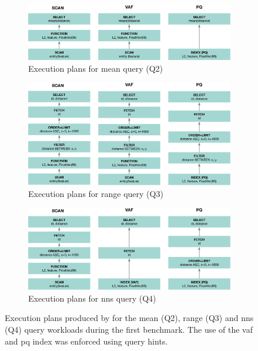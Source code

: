 \begin{figure}[p]
    \centering
    \begin{subfigure}[b]{\textwidth}
        \centering
        \includegraphics[width=\textwidth]{figures/analytics/query-plan-mean}
        \caption{Execution plans for mean query (Q2)}
        \label{figure:cottontail_analytics_mean}
    \end{subfigure}
    \hfill
    \centering
    \begin{subfigure}[b]{\textwidth}
        \centering
        \includegraphics[width=\textwidth]{figures/analytics/query-plan-range}
        \caption{Execution plans for range query (Q3)}
        \label{figure:cottontail_analytics_range}
    \end{subfigure}
    \hfill
    \centering
    \begin{subfigure}[b]{\textwidth}
        \centering
        \includegraphics[width=\textwidth]{figures/analytics/query-plan-nns}
        \caption{Execution plans for \acrshort{nns} query (Q4)}
        \label{figure:cottontail_analytics_nns}
    \end{subfigure}
    \caption{Execution plans produced by \cottontail{} for the mean (Q2), range (Q3) and \acrshort{nns} (Q4) query workloads during the first benchmark. The use of the \acrshort{vaf} and \acrshort{pq} index was enforced using query hints.}
    \label{figure:cottontail_analytics_plans}
\end{figure}

